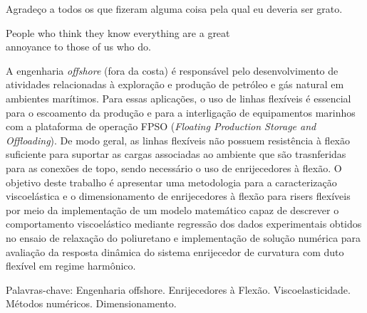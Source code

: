 \documentclass[arial,centeredequations,english,brazilian,oneside,section=TITLE]{ifes8}
\begin{document}
\begin{agradecimentos}
  Agradeço a todos os que fizeram alguma coisa pela qual eu deveria
  ser grato.
\end{agradecimentos}


\begin{epigrafe}
  \vspace*{\fill}
  \begin{otherlanguage}{english}
    \begin{flushright}
      \begin{SingleSpace}
        People who think they know everything are a great \\
        annoyance to those of us who do. \cite{Asimov2004}
      \end{SingleSpace}
    \end{flushright}
  \end{otherlanguage}
\end{epigrafe}


\begin{resumo}

  A engenharia \emph{offshore} (fora da costa) é responsável pelo desenvolvimento de atividades
  relacionadas à exploração e produção de petróleo e gás natural em ambientes marítimos. Para essas
  aplicações, o uso de linhas flexíveis é essencial para o escoamento da produção e para a interligação
  de equipamentos marinhos com a plataforma de operação FPSO (\emph{Floating Production Storage and Offloading}).
  De modo geral, as linhas flexíveis não possuem resistência à flexão suficiente para suportar as cargas associadas
  ao ambiente que são trasnferidas para as conexões de topo, sendo necessário o uso de enrijecedores à flexão.
  O objetivo deste trabalho é apresentar uma metodologia para a caracterização viscoelástica e 
  o dimensionamento de enrijecedores à flexão para risers flexíveis por meio da implementação 
  de um modelo matemático capaz de descrever o comportamento viscoelástico mediante regressão
  dos dados experimentais obtidos no ensaio de relaxação do poliuretano e implementação de solução
  numérica para avaliação da resposta dinâmica do sistema enrijecedor de curvatura com duto flexível
  em regime harmônico.

  Palavras-chave: Engenharia offshore. Enrijecedores à Flexão. Viscoelasticidade. Métodos numéricos. Dimensionamento. 
\end{resumo}
\end{document}
